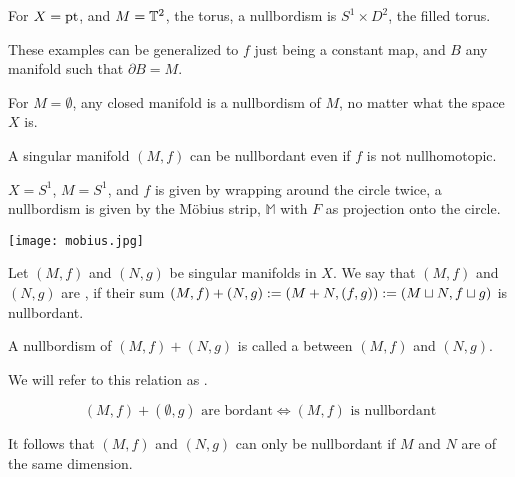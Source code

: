 \documentclass[a4paper,11pt]{article}
\begin{document}
\begin{example}
    For \(X=\mathrm{pt}\), and \(M=\mathbb{T}^2\), the torus, a nullbordism is \(S^1\times D^2\), the filled torus.
\end{example}

\begin{remark}
    These examples can be generalized to \(f\) just being a constant %
    map, and \(B\) any manifold such that \(\partial B=M\). 
\end{remark}

\begin{example}
    For \(M=\emptyset\), any closed manifold is a nullbordism of \(M\), no matter what the space \(X\) is.%
\end{example}

\begin{observation}
    A singular manifold \((M,f)\) can be nullbordant even if \(f\) is not nullhomotopic.
\end{observation}

\begin{example}
    \(X=S^1\), \(M=S^1\), and \(f\) is given by wrapping around the circle twice, a nullbordism is given by the M\"obius strip, \(\mathbb{M}\) with \(F\) as projection onto the circle.\begin{center} \texttt{[image: mobius.jpg]} \end{center}
\end{example}


\begin{definition}\label{bordant}
    Let \((M,f)\) and \((N,g)\) be singular manifolds in \(X\). We say that \((M,f)\) and \((N,g)\) are , if their sum \((M,f)+(N,g):=(M+N, (f,g)):=(M\sqcup N, f\sqcup g)\) is nullbordant.

    A nullbordism of \((M,f)+(N,g)\) is called a  between \((M,f)\) and \((N,g)\).
\end{definition}

We will refer to this relation as .

\begin{remark}
    \[(M,f)+(\emptyset,g) \text{ are bordant} \iff (M,f) \text{ is nullbordant}\]
\end{remark}

\begin{remark}
    It follows that \((M,f)\) and \((N,g)\) can only be nullbordant if \(M\) and \(N\) are of the same dimension.
\end{remark}
\end{document}
